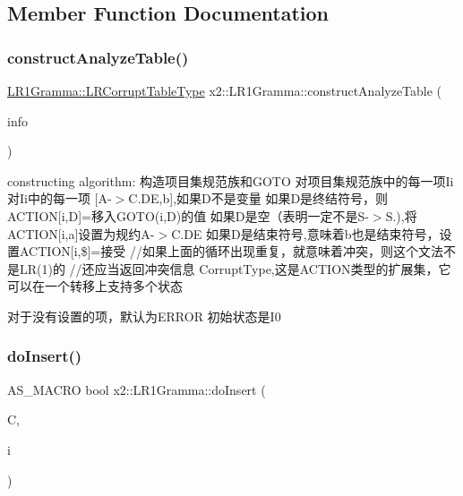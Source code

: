 \subsection{Member Function Documentation}
\mbox{\label{classx2_1_1_l_r1_gramma_ad8e8029481aa8f4ed2990c458ae8e162}} 
\subsubsection{\texorpdfstring{construct\+Analyze\+Table()}{constructAnalyzeTable()}}
{\footnotesize\ttfamily \hyperlink{classx2_1_1_gramma_a03901eb5b196689b901fbf23e5bb9f0e}{L\+R1\+Gramma\+::\+L\+R\+Corrupt\+Table\+Type} x2\+::\+L\+R1\+Gramma\+::construct\+Analyze\+Table (\begin{DoxyParamCaption}\item[{const Info\+Type \&}]{info }\end{DoxyParamCaption})}

constructing algorithm\+: 构造项目集规范族和\+G\+O\+TO 对项目集规范族中的每一项\+Ii 对\+Ii中的每一项 \mbox{[}A-\/$>$C.\+DE,b\mbox{]},如果\+D不是变量 如果\+D是终结符号，则\+A\+C\+T\+I\+ON\mbox{[}i,D\mbox{]}=移入\+G\+O\+T\+O(i,\+D)的值 如果\+D是空（表明一定不是S\textquotesingle{}-\/$>$S.),将\+A\+C\+T\+I\+ON\mbox{[}i,a\mbox{]}设置为规约\+A-\/$>$C.\+DE 如果\+D是结束符号,意味着b也是结束符号，设置\+A\+C\+T\+I\+ON\mbox{[}i,\$\mbox{]}=接受 //如果上面的循环出现重复，就意味着冲突，则这个文法不是\+LR(1)的 //还应当返回冲突信息 Corrupt\+Type,这是\+A\+C\+T\+I\+O\+N类型的扩展集，它可以在一个转移上支持多个状态

对于没有设置的项，默认为\+E\+R\+R\+OR 初始状态是\+I0 \mbox{\label{classx2_1_1_l_r1_gramma_a47cbb98b8eceeae4600067e29f4d67b6}} 
\subsubsection{\texorpdfstring{do\+Insert()}{doInsert()}}
{\footnotesize\ttfamily A\+S\+\_\+\+M\+A\+C\+RO bool x2\+::\+L\+R1\+Gramma\+::do\+Insert (\begin{DoxyParamCaption}\item[{Closure\+Type \&}]{C,  }\item[{const Item\+Type \&}]{i }\end{DoxyParamCaption})\hspace{0.3cm}{\ttfamily [static]}}

